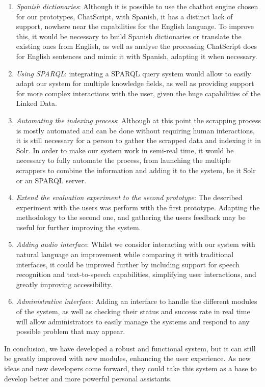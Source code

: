 \begin{enumerate}
 \item \emph{Spanish dictionaries}: Although it is possible to use the chatbot engine chosen for our prototypes, ChatScript, with Spanish, it has a distinct lack of support, nowhere near the capabilities for the English language. To improve this, it would be necessary to build Spanish dictionaries or translate the existing ones from English, as well as analyse the processing ChatScript does for English sentences and mimic it with Spanish, adapting it when necessary.
 \item \emph{Using SPARQL}: integrating a SPARQL query system would allow to easily adapt our system for multiple knowledge fields, as well as providing support for more complex interactions with the user, given the huge capabilities of the Linked Data.
 \item \emph{Automating the indexing process}: Although at this point the scrapping process is mostly automated and can be done without requiring human interactions, it is still necessary for a person to gather the scrapped data and indexing it in Solr. In order to make our system work in semi-real time, it would be necessary to fully automate the process, from launching the multiple scrappers to combine the information and adding it to the system, be it Solr or an SPARQL server.
 \item \emph{Extend the evaluation experiment to the second prototype}: The described experiment with the users was perform with the first prototype. Adapting the methodology to the second one, and gathering the users feedback may be useful for further improving the system.
 \item \emph{Adding audio interface}: Whilst we consider interacting with our system with natural language an improvement while comparing it with traditional interfaces, it could be improved further by including support for speech recognition and text-to-speech capabilities, simplifying user interactions, and greatly improving accessibility.
 \item \emph{Administrative interface}: Adding an interface to handle the different modules of the system, as well as checking their status and success rate in real time will allow administrators to easily manage the systems and respond to any possible problem that may appear.
\end{enumerate}

In conclusion, we have developed a robust and functional system, but it can still be greatly improved with new modules, enhancing the user experience. As new ideas and new developers come forward, they could take this system as a base to develop better and more powerful personal assistants.